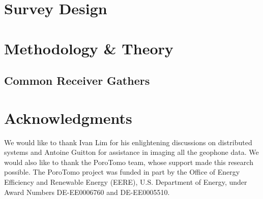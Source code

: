 \section{Survey Design}

\section{Methodology \& Theory}
\subsection{Common Receiver Gathers}



\section{Acknowledgments}
We would like to thank Ivan Lim for his enlightening discussions on distributed systems and Antoine Guitton for assistance in  imaging all the geophone data. We would also like to thank the PoroTomo team, whose support made this research possible. The PoroTomo project was funded in part by the Office of Energy Efficiency and Renewable Energy (EERE), U.S. Department of Energy, under Award Numbers DE-EE0006760 and  DE-EE0005510.



